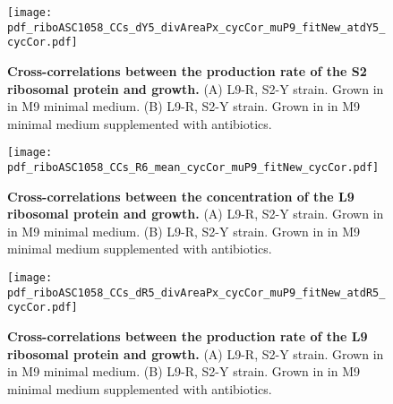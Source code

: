 \begin{figure}
    \centering
    \texttt{[image: pdf\_riboASC1058\_CCs\_dY5\_divAreaPx\_cycCor\_muP9\_fitNew\_atdY5\_cycCor.pdf]}
    \caption{ 
        \textbf{Cross-correlations between the production rate of the S2 ribosomal protein and growth.}
        (A) L9-R, S2-Y strain. Grown in in M9 minimal medium.
        (B) L9-R, S2-Y strain. Grown in in M9 minimal medium supplemented with antibiotics. 
%
    }
    \label{fig:ribo:CCsPmuS2}
\end{figure}





\begin{figure}
    \centering
    \texttt{[image: pdf\_riboASC1058\_CCs\_R6\_mean\_cycCor\_muP9\_fitNew\_cycCor.pdf]}
    \caption{ 
        \textbf{Cross-correlations between the concentration of the L9 ribosomal protein and growth.}
        (A) L9-R, S2-Y strain. Grown in in M9 minimal medium.
        (B) L9-R, S2-Y strain. Grown in in M9 minimal medium supplemented with antibiotics. 
%
    }
    \label{fig:ribo:CCsEmuL9}
\end{figure}

\begin{figure}
    \centering
    \texttt{[image: pdf\_riboASC1058\_CCs\_dR5\_divAreaPx\_cycCor\_muP9\_fitNew\_atdR5\_cycCor.pdf]}
    \caption{ 
        \textbf{Cross-correlations between the production rate of the L9 ribosomal protein and growth.}
        (A) L9-R, S2-Y strain. Grown in in M9 minimal medium.
        (B) L9-R, S2-Y strain. Grown in in M9 minimal medium supplemented with antibiotics. 
%
    }
    \label{fig:ribo:CCsPmuL9}
\end{figure}


